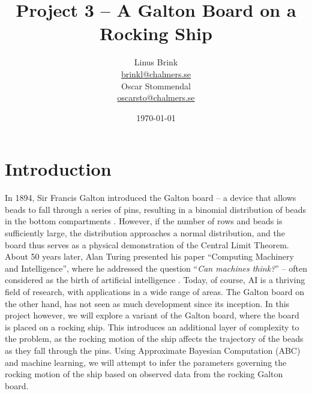 \documentclass[a4paper, 12pt]{article}
\begin{document}
\lstset{language=Python}
\title{
\sffamily
\vspace{-1.7cm}
{\huge\textbf{Project 3 -- A Galton Board on a Rocking Ship}} \\[-0.4cm]
}
\author{
    \vspace{-0.4cm}
    \begin{minipage}[t]{0.45\textwidth}
\centering
Linus Brink\\
\href{mailto:brinkl@chalmers.se}{brinkl@chalmers.se}
\end{minipage}%
\hfill
\begin{minipage}[t]{0.45\textwidth}
\centering
Oscar Stommendal\\
\href{mailto:oscarsto@chalmers.se}{oscarsto@chalmers.se}
\vspace{0.5cm}
\end{minipage}
}
\date{\today}
\maketitle
\vspace{-1.5cm}
\section{Introduction}
In 1894, Sir Francis Galton introduced the Galton board -- a device that allows beads to fall through a series of pins, resulting in a binomial distribution of beads in the bottom compartments \cite{Galton1894NaturalInheritance}. However, if the number of rows and beads is sufficiently large, the distribution approaches a normal distribution, and the board thus serves as a physical demonstration of the Central Limit Theorem. About 50 years later, Alan Turing presented his paper ``Computing Machinery and Intelligence'', where he addressed the question ``\textit{Can machines think?}'' -- often considered as the birth of artificial intelligence \cite{IBMHistoryAI}. Today, of course, AI is a thriving field of research, with applications in a wide range of areas. The Galton board on the other hand, has not seen as much development since its inception. In this project however, we will explore a variant of the Galton board, where the board is placed on a rocking ship. This introduces an additional layer of complexity to the problem, as the rocking motion of the ship affects the trajectory of the beads as they fall through the pins. Using Approximate Bayesian Computation (ABC) and machine learning, we will attempt to infer the parameters governing the rocking motion of the ship based on observed data from the rocking Galton board.
\end{document}
